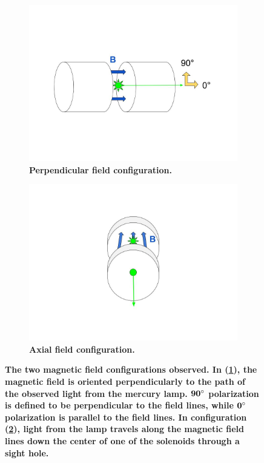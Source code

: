 \documentclass[twocolumn]{article}
\begin{document}
	
	\begin{figure}
		\centering
		\begin{subfigure}{0.5\textwidth}
			\includegraphics[width = 1.0\textwidth]{Images/FieldConfigA.jpg}
			\caption{\textbf{Perpendicular field configuration.}}
			\label{subfig:PerpFieldConfig}
		\end{subfigure}%
		\begin{subfigure}{0.5\textwidth}
			\centering
			\includegraphics[width=1.0\textwidth]{Images/FieldConfigB.jpg}
			\caption{\textbf{Axial field configuration.}}
			\label{subfig:AxialFieldConfig}
		\end{subfigure}%
		\caption{\textbf{The two magnetic field configurations observed. In (\ref{subfig:PerpFieldConfig}), the magnetic field is oriented perpendicularly to the path of the observed light from the mercury lamp. $\mathbf{90\degree}$ polarization is defined to be perpendicular to the field lines, while $\mathbf{0\degree}$ polarization is parallel to the field lines. In configuration (\ref{subfig:AxialFieldConfig}), light from the lamp travels along the magnetic field lines down the center of one of the solenoids through a sight hole.}}
		\label{fig:FieldConfig}
	\end{figure}
	
\end{document}
